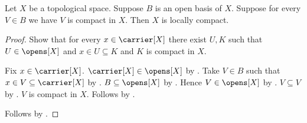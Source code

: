 \begin{theorem}\label{compact_open_basis_implies_locally_compact}
    Let $X$ be a topological space.
    Suppose $B$ is an open basis of $X$.
    Suppose for every $V\in B$ we have $V$ is compact in $X$.
    Then $X$ is locally compact.
\end{theorem}
\begin{proof}
    Show that for every $x\in\carrier[X]$ there exist $U,K$ such that
        $U\in\opens[X]$ and $x\in U\subseteq K$ and
        $K$ is compact in $X$.
    \begin{subproof}
        Fix $x\in\carrier[X]$.
        $\carrier[X]\in\opens[X]$ by .
        Take $V\in B$ such that $x\in V\subseteq\carrier[X]$
            by .
        $B\subseteq\opens[X]$ by .
        Hence $V\in\opens[X]$ by .
        $V\subseteq V$ by .
        $V$ is compact in $X$.
        Follows by \auto.
    \end{subproof}
    Follows by .
\end{proof}
